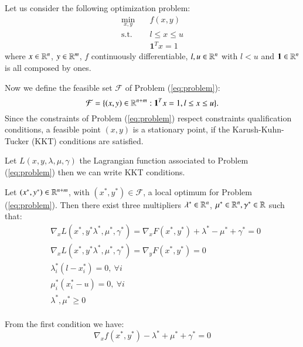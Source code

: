 Let us consider the following optimization problem:
\begin{subequations}\label{eq:problem} 
\begin{align}
\min_{x,y} & \quad f(x,y)  \\
\text{s.t.} & \quad l \leq x \leq u \\
& \quad \mathbf{1}^T x = 1 
\end{align}
\end{subequations}
where $x \in \mathbb{R}^n$, $y \in \mathbb{R}^m$, $f$ continuously differentiable, $l, u \in \mathbb{R}^n$ with $l < u$ and $\mathbf{1} \in \mathbb{R}^n$ is all composed by ones. 

Now we define the feasible set $\mathcal{F}$  of Problem (\ref{eq:problem}):
\begin{equation}
\mathcal{F} = \{(x,y) \in \mathbb{R}^{n+m} : \mathbf{1}^T x = 1, l \leq x \leq u\}.
\end{equation}
Since the constraints of Problem (\ref{eq:problem}) respect constraints qualification conditions, a feasible point $(x,y)$ is a stationary point, if the Karush-Kuhn-Tucker (KKT) conditions are satisfied.

Let $L(x,y,\lambda,\mu,\gamma)$ the Lagrangian function associated to Problem (\ref{eq:problem}) then we can write KKT conditions.

\begin{proposition}\label{prop:KKT}

Let $(x^*,y^*) \in \mathbb{R}^{n+m}$, with $(x^*,y^*) \in \mathcal{F}$, a local optimum for Problem (\ref{eq:problem}). Then there exist three multipliers $\lambda^* \in \mathbb{R}^n$, $\mu^* \in \mathbb{R}^n, \gamma^* \in \mathbb{R}$ such that:
\begin{equation}
 \begin{aligned}
  &\nabla_x L(x^*,y^*\lambda^*,\mu^*,\gamma^*)= \nabla_x F(x^*,y^*)+\lambda^*-\mu^*+\gamma^*=0\\
 &\nabla_x L(x^*,y^*\lambda^*,\mu^*,\gamma^*)=\nabla_y F(x^*,y^*) =0 \\
    &\lambda^*_i(l-x_i^*)=0,\ \forall i\\
 &\mu^*_i(x_i^*-u)=0,\ \forall i\\
   & \lambda^*,\mu^*\ge0 \\
 \end{aligned}
\end{equation}
\end{proposition}

From the first condition we have:
\begin{equation}
 \nabla_x f(x^*,y^*)-\lambda^*+\mu^*+\gamma^*=0
\end{equation}

